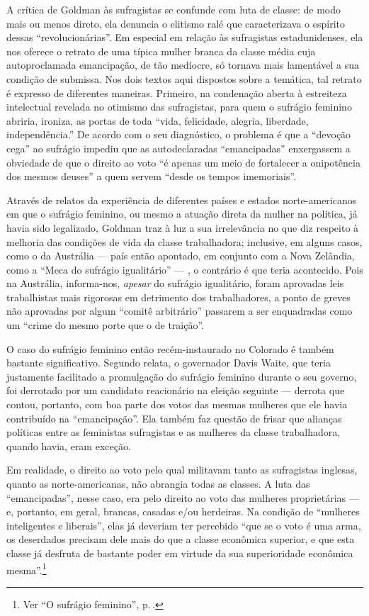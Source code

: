 A crítica de Goldman às sufragistas se confunde com luta de classe: de
modo mais ou menos direto, ela denuncia o elitismo ralé que
caracterizava o espírito dessas ``revolucionárias''. Em especial
em relação às sufragistas estadunidenses, ela nos oferece o
retrato de uma típica mulher branca da classe média cuja autoproclamada
emancipação, de tão medíocre, só tornava mais lamentável a sua condição
de submissa. Nos dois textos aqui dispostos sobre a temática, tal
retrato é expresso de diferentes maneiras. Primeiro, na condenação
aberta à estreiteza intelectual revelada no otimismo das sufragistas,
para quem o sufrágio feminino abriria, ironiza, as portas de toda
``vida, felicidade, alegria, liberdade, independência.'' De acordo com o
seu diagnóstico, o problema é que a ``devoção cega'' ao sufrágio impediu
que as autodeclaradas ``emancipadas'' enxergassem a obviedade de que o
direito ao voto ``é apenas um meio de fortalecer a onipotência dos
mesmos deuses'' a quem servem ``desde os tempos imemoriais''.

Através de relatos da experiência de diferentes países e estados
norte-americanos em que o sufrágio feminino, ou mesmo a atuação direta
da mulher na política, já havia sido legalizado, Goldman traz à luz a
sua irrelevância no que diz respeito à melhoria das condições de vida da
classe trabalhadora; inclusive, em alguns casos, como o da Austrália ---
país então apontado, em conjunto com a Nova Zelândia, como a ``Meca do
sufrágio igualitário'' --- , o contrário é que teria acontecido. Pois na
Austrália, informa-nos, \emph{apesar} do sufrágio igualitário, foram
aprovadas leis trabalhistas mais rigorosas em detrimento dos
trabalhadores, a ponto de greves não aprovadas por algum ``comitê
arbitrário'' passarem a ser enquadradas como um ``crime do mesmo porte
que o de traição''.

O caso do sufrágio feminino então recém-instaurado
no Colorado é também bastante significativo. Segundo relata, o
governador Davis Waite, que teria justamente facilitado a promulgação do
sufrágio feminino durante o seu governo, foi derrotado por um candidato
reacionário na eleição seguinte --- derrota que contou, portanto, com boa
parte dos votos das mesmas mulheres que ele havia contribuído na
``emancipação''. Ela também faz questão de frisar que alianças políticas
entre as feministas sufragistas e as mulheres da classe trabalhadora,
quando havia, eram exceção.

Em realidade, o direito ao voto pelo qual
militavam tanto as sufragistas inglesas, quanto as
norte-americanas, não abrangia todas as classes. A luta das
``emancipadas'', nesse caso, era pelo direito ao voto das mulheres
proprietárias --- e, portanto, em geral, brancas, casadas e/ou herdeiras.
Na condição de ``mulheres inteligentes e liberais'', elas já deveriam ter percebido ``que se o voto
é uma arma, os deserdados precisam dele mais do que a classe econômica
superior, e que esta classe já desfruta de bastante poder em virtude da
sua superioridade econômica mesma''.\footnote{Ver ``O sufrágio feminino'', p.\,\pageref{virtude}.}

